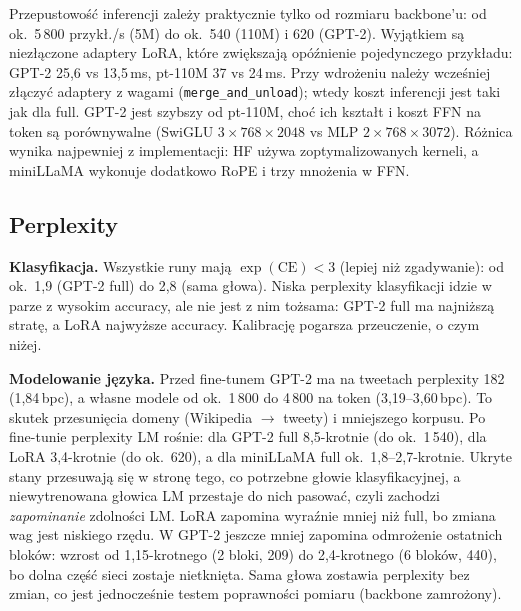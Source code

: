 \documentclass[11pt,a4paper]{article}
\begin{document}
Przepustowość inferencji zależy praktycznie tylko od rozmiaru backbone'u: od ok.\ 5\,800 przykł./s
(5M) do ok.\ 540 (110M) i 620 (GPT-2). Wyjątkiem są niezłączone adaptery LoRA, które zwiększają
opóźnienie pojedynczego przykładu: GPT-2 25,6 vs 13,5\,ms, pt-110M 37 vs 24\,ms. Przy wdrożeniu
należy wcześniej złączyć adaptery z wagami (\texttt{merge\_and\_unload}); wtedy koszt inferencji jest
taki jak dla full. GPT-2 jest szybszy od pt-110M, choć ich kształt i koszt FFN na token są
porównywalne (SwiGLU $3\times768\times2048$ vs MLP $2\times768\times3072$). Różnica wynika najpewniej
z implementacji: HF używa zoptymalizowanych kerneli, a miniLLaMA wykonuje dodatkowo RoPE
i trzy mnożenia w FFN.

\subsection{Perplexity}
\textbf{Klasyfikacja.} Wszystkie runy mają $\exp(\mathrm{CE}) < 3$ (lepiej niż zgadywanie):
od ok.\ 1,9 (GPT-2 full) do 2,8 (sama głowa). Niska perplexity klasyfikacji idzie w parze
z wysokim accuracy, ale nie jest z nim tożsama: GPT-2 full ma najniższą stratę, a LoRA najwyższe
accuracy. Kalibrację pogarsza przeuczenie, o czym niżej.

\textbf{Modelowanie języka.} Przed fine-tunem GPT-2 ma na tweetach perplexity 182 (1,84\,bpc),
a własne modele od ok.\ 1\,800 do 4\,800 na token (3,19--3,60\,bpc). To skutek przesunięcia
domeny (Wikipedia $\rightarrow$ tweety) i mniejszego korpusu. Po fine-tunie perplexity LM rośnie:
dla GPT-2 full 8,5-krotnie (do ok.\ 1\,540), dla LoRA 3,4-krotnie (do ok.\ 620), a dla miniLLaMA
full ok.\ 1,8--2,7-krotnie. Ukryte stany przesuwają się w stronę tego, co potrzebne głowie
klasyfikacyjnej, a niewytrenowana głowica LM przestaje do nich pasować, czyli zachodzi
\emph{zapominanie} zdolności LM. LoRA zapomina wyraźnie mniej niż full, bo zmiana wag jest niskiego
rzędu. W GPT-2 jeszcze mniej zapomina odmrożenie ostatnich bloków: wzrost od 1,15-krotnego (2 bloki,
209) do 2,4-krotnego (6 bloków, 440), bo dolna część sieci zostaje nietknięta.
Sama głowa zostawia perplexity bez zmian, co jest jednocześnie testem poprawności pomiaru
(backbone zamrożony).
\end{document}
